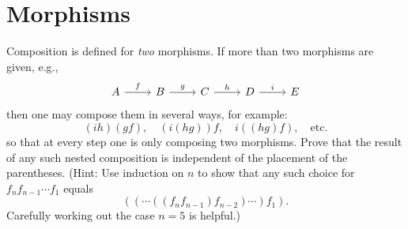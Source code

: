 \documentclass[../../master.tex]{subfiles}
\begin{document}
\section{Morphisms}

    \begin{problem}
      Composition is defined for \textit{two} morphisms.
      If more than two morphisms are given, e.g.,
      \[
      \begin{tikzcd}
        {A} & {B} & {C} & {D} & {E}
        \arrow["{f}", from=1-1, to=1-2]
        \arrow["{g}", from=1-2, to=1-3]
        \arrow["{h}", from=1-3, to=1-4]
        \arrow["{i}", from=1-4, to=1-5]
      \end{tikzcd}
      \]
      then one may compose them in several ways, for example:
      \begin{equation*}
        (ih)(gf), \quad (i(hg))f, \quad i((hg)f), \quad \text{etc.}
      \end{equation*}
      so that at every step one is only composing two morphisms.
      Prove that the result of any such nested composition is independent of the placement of the parentheses.
      (Hint: Use induction on \(n\) to show that any such choice for \(f_{n} f_{n-1} \cdots f_{1}\) equals
      \begin{equation*}
        ((\cdots ((f_{n} f_{n-1}) f_{n-2}) \cdots) f_{1}).
      \end{equation*}
      Carefully working out the case \(n=5\) is helpful.)
    \end{problem}
\end{document}
